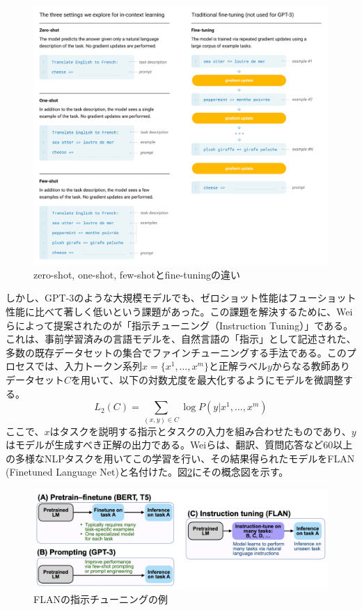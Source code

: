 \documentclass[a4paper,11pt]{jreport}
\begin{document}
\begin{figure}[t]
  \centering
  \includegraphics[width=0.9\linewidth]{./fig/gpt3_fig2.png}
  \caption{zero-shot, one-shot, few-shotとfine-tuningの違い\cite{GPT-3}}
  \label{fig:gpt3_example}
\end{figure}

しかし、GPT-3のような大規模モデルでも、ゼロショット性能はフューショット性能に比べて著しく低いという課題があった。この課題を解決するために、Weiらによって提案されたのが「指示チューニング（Instruction Tuning）」である\cite{Instruction-Tuning}。これは、事前学習済みの言語モデルを、自然言語の「指示」として記述された、多数の既存データセットの集合でファインチューニングする手法である。このプロセスでは、入力トークン系列$x = \{x^1, \dots, x^m\}$と正解ラベル$y$からなる教師ありデータセット$C$を用いて、以下の対数尤度を最大化するようにモデルを微調整する。
$$
L_2(C) = \sum_{(x,y) \in C} \log P(y | x^1, \dots, x^m)
$$
ここで、$x$はタスクを説明する指示とタスクの入力を組み合わせたものであり、$y$はモデルが生成すべき正解の出力である。Weiらは、翻訳、質問応答など60以上の多様なNLPタスクを用いてこの学習を行い、その結果得られたモデルをFLAN (Finetuned Language Net)と名付けた。図\ref{fig:flan_example}にその概念図を示す。

\begin{figure}[t]
  \centering
  \includegraphics[width=0.9\linewidth]{./fig/flan_fig2.png}
  \caption{FLANの指示チューニングの例\cite{Instruction-Tuning}}
  \label{fig:flan_example}
\end{figure}
\end{document}
